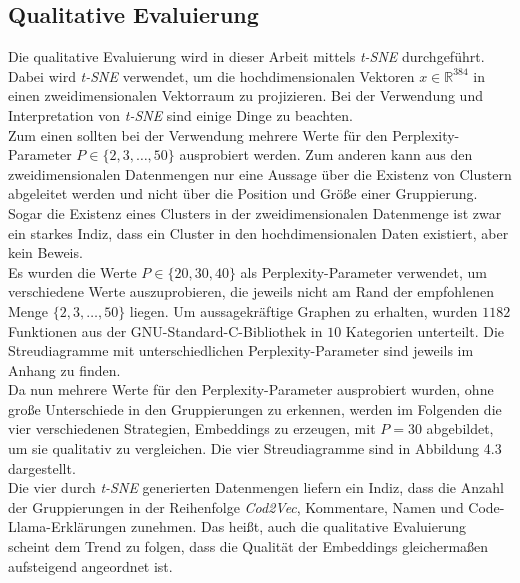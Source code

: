 \documentclass[12pt,letterpaper,ngerman]{article}
\begin{document}
\subsection{Qualitative Evaluierung} 
Die qualitative Evaluierung wird in dieser Arbeit mittels
\textit{t-SNE} durchgeführt. Dabei wird \textit{t-SNE} verwendet,
um die hochdimensionalen Vektoren $x \in \mathbb{R}^{384}$ in einen
zweidimensionalen Vektorraum zu projizieren. Bei der Verwendung und 
Interpretation von \textit{t-SNE} sind einige Dinge zu beachten.\\
Zum einen sollten bei der Verwendung mehrere Werte für den
Perplexity-Parameter $P \in \{2,3,\dots ,50\}$ ausprobiert werden. 
Zum anderen kann aus den zweidimensionalen Datenmengen nur eine Aussage
über die Existenz von Clustern abgeleitet werden und nicht über die
Position und Größe einer Gruppierung. Sogar die Existenz eines Clusters 
in der zweidimensionalen Datenmenge ist zwar ein starkes Indiz,
dass ein Cluster in den hochdimensionalen Daten existiert, 
aber kein Beweis.\\
Es wurden die Werte $P \in \{20, 30, 40\}$ als Perplexity-Parameter 
verwendet, um verschiedene Werte auszuprobieren, die jeweils nicht 
am Rand der empfohlenen Menge $\{2,3, \dots, 50\}$ liegen.
Um aussagekräftige Graphen zu erhalten, wurden $1182$ Funktionen aus
der GNU-Standard-C-Bibliothek in $10$ Kategorien unterteilt. Die 
Streudiagramme mit unterschiedlichen Perplexity-Parameter sind 
jeweils im Anhang zu finden.\\
Da nun mehrere Werte für den Perplexity-Parameter ausprobiert wurden,
ohne große Unterschiede in den Gruppierungen zu erkennen, werden im 
Folgenden die vier verschiedenen Strategien, Embeddings zu erzeugen,
mit $P = 30$ abgebildet, um sie qualitativ zu vergleichen. Die 
vier Streudiagramme sind in Abbildung 4.3 dargestellt.\\
Die vier durch \textit{t-SNE} generierten Datenmengen liefern ein Indiz,
dass die Anzahl der Gruppierungen in der Reihenfolge 
\textit{Cod2Vec}, Kommentare, Namen und Code-Llama-Erklärungen zunehmen.
Das heißt, auch die qualitative Evaluierung scheint dem Trend zu 
folgen, dass die Qualität der Embeddings gleichermaßen aufsteigend
angeordnet ist.
%
%
%
\end{document}
